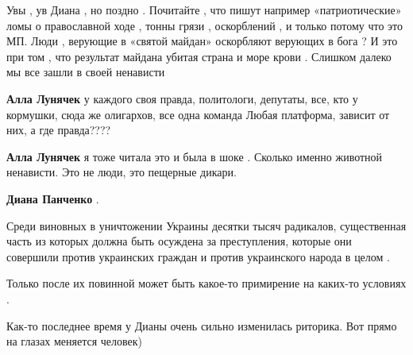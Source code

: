 \begin{itemize}
Увы , ув Диана , но поздно . Почитайте , что пишут например «патриотические»
ломы о православной ходе , тонны грязи , оскорблений , и только потому что это
МП. Люди , верующие в «святой майдан» оскорбляют верующих в бога ? И это при
том , что результат майдана убитая страна и море крови . Слишком далеко мы все
зашли в своей ненависти

\begin{itemize}
 
\textbf{Алла Лунячек} у каждого своя правда, политологи, депутаты, все, кто у кормушки, сюда же олигархов, все одна команда
Любая платформа, зависит от них, а где правда????

 
\textbf{Алла Лунячек} я тоже читала это и была в шоке . Сколько именно животной ненависти. Это не люди, это пещерные дикари.
\end{itemize}

 
\textbf{Диана Панченко} .

Среди виновных в уничтожении Украины десятки тысяч радикалов, существенная
часть из которых должна быть осуждена за преступления, которые они совершили
против украинских граждан и против украинского народа в целом .

Только после их повинной может быть какое-то примирение на каких-то условиях .


 

Как-то последнее время у Дианы очень сильно изменилась риторика. Вот прямо на
глазах меняется человек)


\end{itemize}

